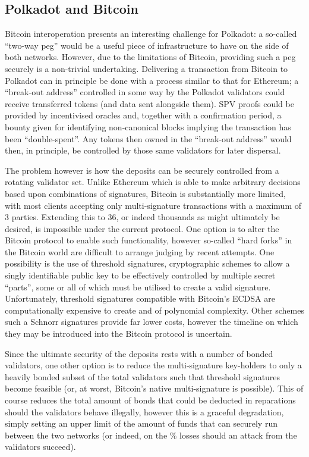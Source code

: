 \documentclass[9pt,oneside]{amsart}
\begin{document}
\begin{multicols}{2}
\subsection{Polkadot and Bitcoin}\label{disparity-and-bitcoin}

 Bitcoin interoperation presents an interesting challenge for Polkadot: a so-called ``two-way peg'' would be a useful piece of infrastructure to have on the side of both networks. However, due to the limitations of Bitcoin, providing such a peg securely is a non-trivial undertaking. Delivering a transaction from Bitcoin to Polkadot can in principle be done with a process similar to that for Ethereum; a ``break-out address'' controlled in some way by the Polkadot validators could receive transferred tokens (and data sent alongside them). SPV proofs could be provided by incentivised oracles and, together with a confirmation period, a bounty given for identifying non-canonical blocks implying the transaction has been ``double-spent''. Any tokens then owned in the ``break-out address'' would then, in principle, be controlled by those same validators for later dispersal.

 The problem however is how the deposits can be securely controlled from a rotating validator set. Unlike Ethereum which is able to make arbitrary decisions based upon combinations of signatures, Bitcoin is substantially more limited, with most clients accepting only multi-signature transactions with a maximum of 3 parties. Extending this to 36, or indeed thousands as might ultimately be desired, is impossible under the current protocol. One option is to alter the Bitcoin protocol to enable such functionality, however so-called ``hard forks'' in the Bitcoin world are difficult to arrange judging by recent attempts. One possibility is the use of threshold signatures, cryptographic schemes to allow a singly identifiable public key to be effectively controlled by multiple secret ``parts'', some or all of which must be utilised to create a valid signature. Unfortunately, threshold signatures compatible with Bitcoin's ECDSA are computationally expensive to create and of polynomial complexity. Other schemes such a Schnorr signatures provide far lower costs, however the timeline on which they may be introduced into the Bitcoin protocol is uncertain.

 Since the ultimate security of the deposits rests with a number of bonded validators, one other option is to reduce the multi-signature key-holders to only a heavily bonded subset of the total validators such that threshold signatures become feasible (or, at worst, Bitcoin's native multi-signature is possible). This of course reduces the total amount of bonds that could be deducted in reparations should the validators behave illegally, however this is a graceful degradation, simply setting an upper limit of the amount of funds that can securely run between the two networks (or indeed, on the \% losses should an attack from the validators succeed).


\end{multicols}
\end{document}
